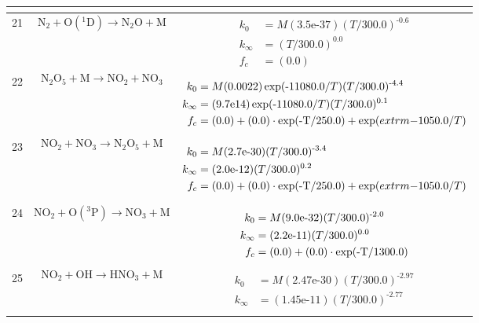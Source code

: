 \begin{longtable}{| m{} | m{}| m{} |}
$$$$
 \\
\hline
 21 & $$ \mathrm{N_2} + \mathrm{O(^1D)}\longrightarrow \mathrm{N_2O} + \mathrm{M} $$ & $$
\begin{aligned}
    k_0 &= M(\textrm{3.5e-37})(T/\textrm{300.0})^{\textrm{-0.6}} \\
    k_{\infty} &= (T/\textrm{300.0})^{\textrm{0.0}} \\
    f_c &= (\textrm{0.0}) 
\end{aligned}
$$
 \\
\hline
 22 & $$ \mathrm{N_2O_5} + \mathrm{M}\longrightarrow \mathrm{NO_2} + \mathrm{NO_3} $$ & $$
\begin{aligned}
    k_0 &= M(\textrm{0.0022})\exp(\textrm{-11080.0}/T)(T/\textrm{300.0})^{\textrm{-4.4}} \\
    k_{\infty} &= (\textrm{9.7e14})\exp(\textrm{-11080.0}/T)(T/\textrm{300.0})^{\textrm{0.1}} \\
    f_c &= (\textrm{0.0}) + (\textrm{0.0})\cdot\exp(\textrm{-T/\textrm{250.0}}) + \exp(	extrm{-1050.0}/T)
\end{aligned}
$$
 \\
\hline
 23 & $$ \mathrm{NO_2} + \mathrm{NO_3}\longrightarrow \mathrm{N_2O_5} + \mathrm{M} $$ & $$
\begin{aligned}
    k_0 &= M(\textrm{2.7e-30})(T/\textrm{300.0})^{\textrm{-3.4}} \\
    k_{\infty} &= (\textrm{2.0e-12})(T/\textrm{300.0})^{\textrm{0.2}} \\
    f_c &= (\textrm{0.0}) + (\textrm{0.0})\cdot\exp(\textrm{-T/\textrm{250.0}}) + \exp(	extrm{-1050.0}/T)
\end{aligned}
$$
 \\
\hline
 24 & $$ \mathrm{NO_2} + \mathrm{O(^3P)}\longrightarrow \mathrm{NO_3} + \mathrm{M} $$ & $$
\begin{aligned}
    k_0 &= M(\textrm{9.0e-32})(T/\textrm{300.0})^{\textrm{-2.0}} \\
    k_{\infty} &= (\textrm{2.2e-11})(T/\textrm{300.0})^{\textrm{0.0}} \\
    f_c &= (\textrm{0.0}) + (\textrm{0.0})\cdot\exp(\textrm{-T/\textrm{1300.0}}) 
\end{aligned}
$$
 \\
\hline
 25 & $$ \mathrm{NO_2} + \mathrm{OH}\longrightarrow \mathrm{HNO_3} + \mathrm{M} $$ & $$
\begin{aligned}
    k_0 &= M(\textrm{2.47e-30})(T/\textrm{300.0})^{\textrm{-2.97}} \\
    k_{\infty} &= (\textrm{1.45e-11})(T/\textrm{300.0})^{\textrm{-2.77}} \\

\end{aligned}$$
\end{longtable}

